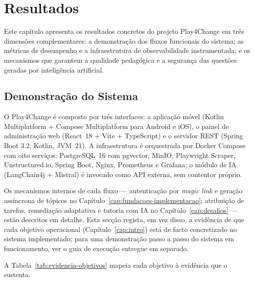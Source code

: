 %
%
\chapter{Resultados} \label{cap:resultados}

Este capítulo apresenta os resultados concretos do projeto Play4Change em três dimensões complementares: a demonstração dos fluxos funcionais do sistema; as métricas de desempenho e a infraestrutura de observabilidade instrumentada; e os mecanismos que garantem a qualidade pedagógica e a segurança das questões geradas por inteligência artificial.

\section{Demonstração do Sistema} \label{sec:demonstracao}

O Play4Change é composto por três interfaces: a aplicação móvel (Kotlin Multiplatform + Compose Multiplatform para Android e iOS), o painel de administração web (React~18 + Vite + TypeScript) e o servidor REST (Spring Boot 3.2, Kotlin, JVM~21). A infraestrutura é orquestrada por Docker Compose com oito serviços: PostgreSQL~16 com pgvector, MinIO, Playwright Scraper, Unstructured.io, Spring Boot, Nginx, Prometheus e Grafana; o módulo de IA (LangChain4j + Mistral) é invocado como API externa, sem contentor próprio.

Os mecanismos internos de cada fluxo --- autenticação por \textit{magic link} e geração assíncrona de tópicos no Capítulo~\ref{cap:fundacoes-implementacao}; atribuição de tarefas, remediação adaptativa e tutoria com IA no Capítulo~\ref{cap:desafios} --- estão descritos em detalhe. Esta secção regista, em vez disso, a evidência de que cada objetivo operacional (Capítulo~\ref{cap:intro}) está de facto concretizado no sistema implementado; para uma demonstração passo a passo do sistema em funcionamento, ver o guia de execução entregue em separado.

A Tabela~\ref{tab:evidencia-objetivos} mapeia cada objetivo à evidência que o sustenta.

